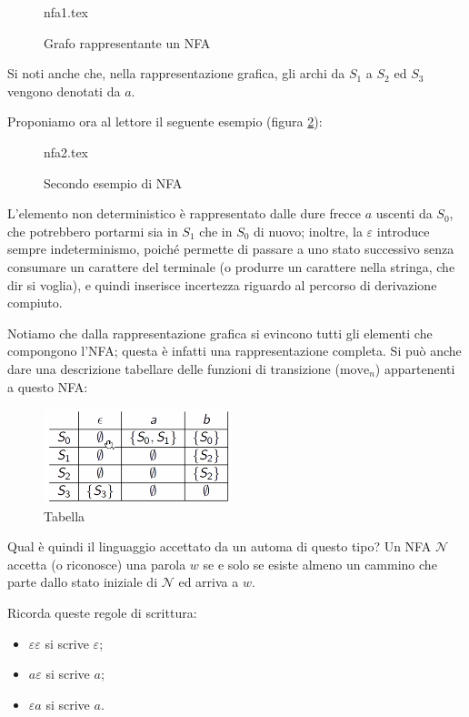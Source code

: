 \documentclass[class=book, crop=false, oneside, 12pt]{standalone}
\begin{document}
\begin{figure}[htb]
	\centering
	{nfa1.tex}
	\label{nfa_grafo_esempio}
    \caption{Grafo rappresentante un NFA}
\end{figure}

\noindent Si noti anche che, nella rappresentazione grafica, gli archi da \(S_1\) a \(S_2\) ed \(S_3\) vengono denotati da \(a\).

Proponiamo ora al lettore il seguente esempio (figura \ref{nfa_grafo_2}):
\begin{figure}[htb]
    \centering
    {nfa2.tex}
    \caption{Secondo esempio di NFA}
    \label{nfa_grafo_2}
\end{figure}
L’elemento non deterministico è rappresentato dalle dure frecce \(a\) uscenti da \(S_0\), che potrebbero portarmi sia in \(S_1\) che in \(S_0\) di nuovo; inoltre, la \(\varepsilon\) introduce sempre indeterminismo, poiché permette di passare a uno stato successivo senza consumare un carattere del terminale (o produrre un carattere nella stringa, che dir si voglia), e quindi inserisce incertezza riguardo al percorso di derivazione compiuto.

Notiamo che dalla rappresentazione grafica si evincono tutti gli elementi che compongono l’NFA; questa è infatti una rappresentazione completa.
Si può anche dare una descrizione tabellare delle funzioni di transizione (\(\textrm{move}_n\)) appartenenti a questo NFA:

\begin{figure}
    \centering
    \includegraphics[width=.4\textwidth,keepaspectratio]{tabella}
    \caption{Tabella}
    \label{tabella}
\end{figure}

Qual è quindi il linguaggio accettato da un automa di questo tipo?\label{linguaggio_definito_da_un_automa} 
Un NFA \(\mathcal{N}\) accetta (o riconosce) una parola \(w\) se e solo se esiste almeno un cammino che parte dallo stato iniziale di \(\mathcal{N}\) ed arriva a \(w\).

Ricorda queste regole di scrittura:
\begin{itemize}
    \item \(\varepsilon \varepsilon\) si scrive \(\varepsilon\);
    \item \(a\varepsilon\) si scrive \(a\);
    \item \(\varepsilon a\) si scrive \(a\).
\end{itemize}
\end{document}
